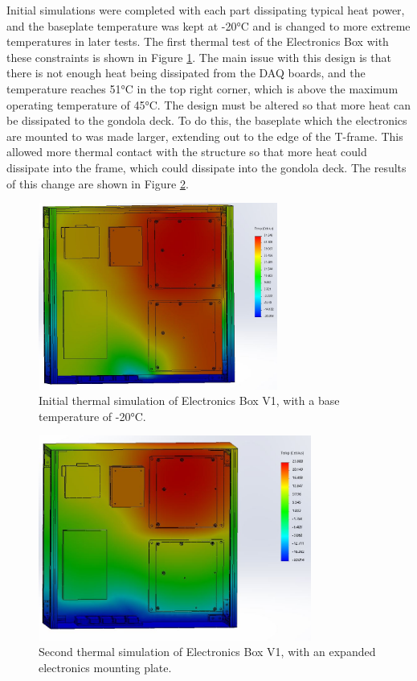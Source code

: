 Initial simulations were completed with each part dissipating typical heat power, and the baseplate temperature was kept at -20°C and is changed to more extreme temperatures in later tests. The first thermal test of the Electronics Box with these constraints is shown in Figure \ref{fig:EBOX_V1_TA_1_SQUARECENTRE}. The main issue with this design is that there is not enough heat being dissipated from the DAQ boards, and the temperature reaches 51°C in the top right corner, which is above the maximum operating temperature of 45°C. The design must be altered so that more heat can be dissipated to the gondola deck. To do this, the baseplate which the electronics are mounted to was made larger, extending out to the edge of the T-frame. This allowed more thermal contact with the structure so that more heat could dissipate into the frame, which could dissipate into the gondola deck. The results of this change are shown in Figure \ref{fig:EBOX_V1_TA_2_BIGGERCENTRE}.

\begin{figure}
    \centering
    \includegraphics[width=0.7\textwidth]{chap3_images/LIFE_V2_images/TA_-20_square_centre_plate.JPG}
    \caption{Initial thermal simulation of Electronics Box V1, with a base temperature of -20°C.}
    \label{fig:EBOX_V1_TA_1_SQUARECENTRE}
\end{figure}

\begin{figure}
    \centering
    \includegraphics[width=0.8\textwidth]{chap3_images/LIFE_V2_images/TA_-20_expanded_centre_plate.JPG}
    \caption{Second thermal simulation of Electronics Box V1, with an expanded electronics mounting plate.}
    \label{fig:EBOX_V1_TA_2_BIGGERCENTRE}
\end{figure}

